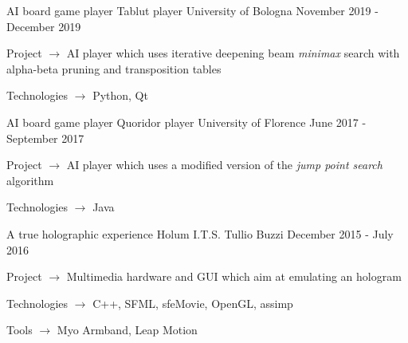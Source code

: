 
\begin{cventries}

  \cventry
    {AI board game player}
    {Tablut player}
    {University of Bologna}
    {November 2019 - December 2019}
    {
      \begin{cvitems}
        \item {Project $\rightarrow$ AI player which uses iterative deepening beam \textit{minimax} search with alpha-beta pruning and transposition tables}
        \item {Technologies $\rightarrow$ Python, Qt}
      \end{cvitems}
    }
 
  \cventry
    {AI board game player}
    {Quoridor player}
    {University of Florence}
    {June 2017 - September 2017}
    {
      \begin{cvitems}
        \item {Project $\rightarrow$ AI player which uses a modified version of the \textit{jump point search} algorithm}
        \item {Technologies $\rightarrow$ Java}
      \end{cvitems}
    }

  \cventry
    {A true holographic experience}
    {Holum}
    {I.T.S. Tullio Buzzi}
    {December 2015 - July 2016}
    {
      \begin{cvitems}
        \item {Project $\rightarrow$ Multimedia hardware and GUI which aim at emulating an hologram}
        \item {Technologies $\rightarrow$ C++, SFML, sfeMovie, OpenGL, assimp}
        \item {Tools $\rightarrow$ Myo Armband, Leap Motion}
      \end{cvitems}
    }

\end{cventries}
